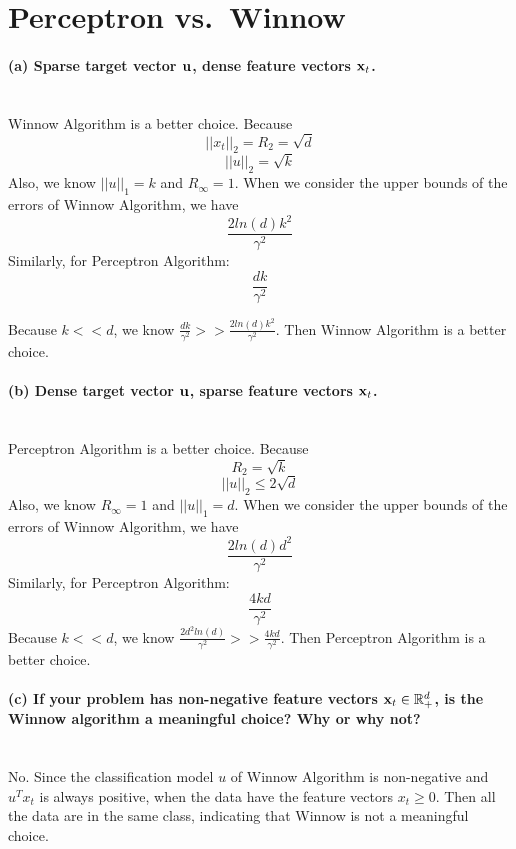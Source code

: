 \section{Perceptron vs.\ Winnow}




\paragraph{(a) Sparse target vector ${\mathbf u}$, dense feature vectors ${\mathbf x}_t$.}
~\\

Winnow Algorithm is a better choice. Because
\[
||x_t||_2 = R_2 = \sqrt{d} 
\]
\[
||u||_2 = \sqrt{k}
\]
Also, we know $||u||_1 = k$ and $R_{\infty} = 1$. When we consider the upper bounds of the errors of Winnow Algorithm, we have 
\[
\frac{2ln(d)k^2}{\gamma^2}
\]
Similarly, for Perceptron Algorithm: 
\[
\frac{dk}{\gamma^2}
\]


Because $k<<d$, we know $\frac{dk}{\gamma^2} >> \frac{2ln(d)k^2}{\gamma^2}$. Then Winnow Algorithm is a better choice.

\paragraph{(b) Dense target vector ${\mathbf u}$, sparse feature vectors ${\mathbf x}_t$.}
~\\

Perceptron Algorithm is a better choice. Because
\[
R_2 = \sqrt{k}
\]
\[
||u||_2 \leq 2\sqrt{d}
\]
Also, we know $R_\infty = 1$ and $||u||_1 = d$. When we consider the upper bounds of the errors of Winnow Algorithm, we have 
\[
\frac{2ln(d)d^2}{\gamma^2}
\]
Similarly, for Perceptron Algorithm: 
\[
\frac{4kd}{\gamma^2}
\]
Because $k<<d$, we know $\frac{2d^2ln(d)}{\gamma^2} >> \frac{4kd}{\gamma^2}$. Then Perceptron Algorithm is a better choice.

\paragraph{(c) If your problem has non-negative feature vectors ${\mathbf x}_t\in{\mathbb R}_+^d$, is the Winnow algorithm a meaningful choice? Why or why not? }
~\\

No. Since the classification model $u$ of Winnow Algorithm is non-negative and $u^T x_t$ is always positive, when the data have the feature vectors $x_t \geq 0$. Then all the data are in the same class, indicating that Winnow is not a meaningful choice.